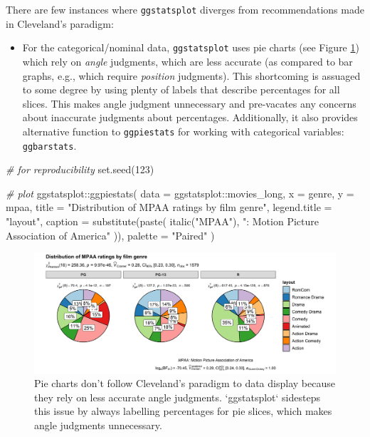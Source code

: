\documentclass[
]{article}
\newenvironment{Shaded}{\begin{snugshade}}{\end{snugshade}}
\newcommand{\AttributeTok}[1]{\textcolor[rgb]{0.77,0.63,0.00}{#1}}
\newcommand{\CommentTok}[1]{\textcolor[rgb]{0.56,0.35,0.01}{\textit{#1}}}
\newcommand{\DecValTok}[1]{\textcolor[rgb]{0.00,0.00,0.81}{#1}}
\newcommand{\FunctionTok}[1]{\textcolor[rgb]{0.00,0.00,0.00}{#1}}
\newcommand{\NormalTok}[1]{#1}
\newcommand{\SpecialCharTok}[1]{\textcolor[rgb]{0.00,0.00,0.00}{#1}}
\newcommand{\StringTok}[1]{\textcolor[rgb]{0.31,0.60,0.02}{#1}}
\providecommand{\tightlist}{%
  \setlength{\itemsep}{0pt}\setlength{\parskip}{0pt}}
\begin{document}
There are few instances where \texttt{ggstatsplot} diverges from recommendations made
in Cleveland's paradigm:

\begin{itemize}
\tightlist
\item
  For the categorical/nominal data, \texttt{ggstatsplot} uses pie charts (see Figure
  \ref{fig:fig2}) which rely on \emph{angle} judgments, which are less accurate (as
  compared to bar graphs, e.g., which require \emph{position} judgments). This
  shortcoming is assuaged to some degree by using plenty of labels that
  describe percentages for all slices. This makes angle judgment unnecessary
  and pre-vacates any concerns about inaccurate judgments about percentages.
  Additionally, it also provides alternative function to \texttt{ggpiestats} for
  working with categorical variables: \texttt{ggbarstats}.
\end{itemize}

\begin{Shaded}
\begin{Highlighting}[]
\CommentTok{\# for reproducibility}
\FunctionTok{set.seed}\NormalTok{(}\DecValTok{123}\NormalTok{)}

\CommentTok{\# plot}
\NormalTok{ggstatsplot}\SpecialCharTok{::}\FunctionTok{ggpiestats}\NormalTok{(}
  \AttributeTok{data =}\NormalTok{ ggstatsplot}\SpecialCharTok{::}\NormalTok{movies\_long,}
  \AttributeTok{x =}\NormalTok{ genre,}
  \AttributeTok{y =}\NormalTok{ mpaa,}
  \AttributeTok{title =} \StringTok{"Distribution of MPAA ratings by film genre"}\NormalTok{,}
  \AttributeTok{legend.title =} \StringTok{"layout"}\NormalTok{,}
  \AttributeTok{caption =} \FunctionTok{substitute}\NormalTok{(}\FunctionTok{paste}\NormalTok{(}
    \FunctionTok{italic}\NormalTok{(}\StringTok{"MPAA"}\NormalTok{), }\StringTok{": Motion Picture Association of America"}
\NormalTok{  )),}
  \AttributeTok{palette =} \StringTok{"Paired"}
\NormalTok{)}
\end{Highlighting}
\end{Shaded}

\begin{figure}[H]
\includegraphics[width=1\linewidth]{./figures/paper-fig2-1} \caption{Pie charts don't follow Cleveland's paradigm to data display because they rely on less accurate angle judgments. `ggstatsplot` sidesteps this issue by always labelling percentages for pie slices, which makes angle judgments unnecessary.}\label{fig:fig2}
\end{figure}
\end{document}
